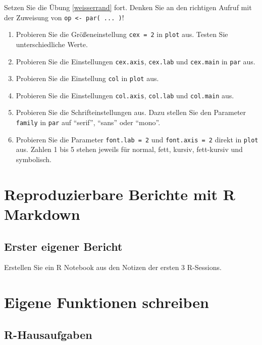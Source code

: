 \documentclass[]{book}
\providecommand{\tightlist}{%
  \setlength{\itemsep}{0pt}\setlength{\parskip}{0pt}}
\begin{document}
Setzen Sie die Übung \ref{weisserrand} fort. Denken Sie an den richtigen Aufruf mit der Zuweisung von \texttt{op\ \textless{}-\ par(\ ...\ )}!

\begin{enumerate}
\def\labelenumi{\arabic{enumi}.}
\tightlist
\item
  Probieren Sie die Größeneinstellung \texttt{cex\ =\ 2} in \texttt{plot} aus. Testen Sie unterschiedliche Werte.
\item
  Probieren Sie die Einstellungen \texttt{cex.axis}, \texttt{cex.lab} und \texttt{cex.main} in \texttt{par} aus.
\item
  Probieren Sie die Einstellung \texttt{col} in \texttt{plot} aus.
\item
  Probieren Sie die Einstellungen \texttt{col.axis}, \texttt{col.lab} und \texttt{col.main} aus.
\item
  Probieren Sie die Schrifteinstellungen aus. Dazu stellen Sie den Parameter \texttt{family} in \texttt{par} auf ``serif'', ``sans'' oder ``mono''.
\item
  Probieren Sie die Parameter \texttt{font.lab\ =\ 2} und \texttt{font.axis\ =\ 2} direkt in \texttt{plot} aus. Zahlen 1 bis 5 stehen jeweils für normal, fett, kursiv, fett-kursiv und symbolisch.
\end{enumerate}

\hypertarget{reproduzierbare-berichte-mit-r-markdown-1}{%
\section{Reproduzierbare Berichte mit R Markdown}\label{reproduzierbare-berichte-mit-r-markdown-1}}

\hypertarget{erster-eigener-bericht}{%
\subsection{Erster eigener Bericht}\label{erster-eigener-bericht}}

Erstellen Sie ein R Notebook aus den Notizen der ersten 3 R-Sessions.

\hypertarget{eigene-funktionen-schreiben-1}{%
\section{Eigene Funktionen schreiben}\label{eigene-funktionen-schreiben-1}}

\hypertarget{r-hausaufgaben}{%
\subsection{R-Hausaufgaben}\label{r-hausaufgaben}}
\end{document}
